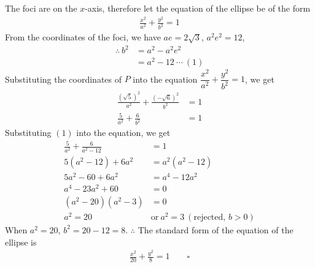 \documentclass{report}
\newcommand{\eos}{ \qquad \square}
\begin{document}
\begin{enumerate}[leftmargin=*]
\begin{enumerate}
                    The foci are on the $x$-axis, therefore let the equation of the ellipse be of
                    the form
                    \begin{align*}
                        \frac{x^2}{a^2} + \frac{y^2}{b^2} = 1
                    \end{align*}
                    From the coordinates of the foci, we have
                    $ae = 2\sqrt{3}$, $a^2e^2 = 12$,
                    \begin{align*}
                        \therefore\ b^2 & = a^2 - a^2e^2          \\
                                        & = a^2 - 12\ \cdots\ (1)
                    \end{align*}
                    Substituting the coordinates of $P$ into the equation $\dfrac{x^2}{a^2} + \dfrac{y^2}{b^2} = 1$, we get
                    \begin{align*}
                        \frac{(\sqrt{5})^2}{a^2} + \frac{(-\sqrt{6})^2}{b^2} & = 1 \\
                        \frac{5}{a^2} + \frac{6}{b^2}                        & = 1
                    \end{align*}
                    Substituting $(1)$ into the equation, we get
                    \begin{align*}
                        \frac{5}{a^2} + \frac{6}{a^2 - 12} & = 1                                           \\
                        5(a^2 - 12) + 6a^2                 & = a^2(a^2 - 12)                               \\
                        5a^2 - 60 + 6a^2                   & = a^4 - 12a^2                                 \\
                        a^4 - 23a^2 + 60                   & = 0                                           \\
                        (a^2 - 20)(a^2 - 3)                & = 0                                           \\
                        a^2 = 20\                          & \text{or}\ a^2 = 3\ (\text{rejected, } b > 0)
                    \end{align*}
                    When $a^2 = 20$, $b^2 = 20 - 12 = 8$.
                    $\therefore$ The standard form of the equation of the ellipse is
                    \begin{align*}
                        \frac{x^2}{20} + \frac{y^2}{8} = 1 \eos

\end{align*}
\end{enumerate}
\end{enumerate}
\end{document}

